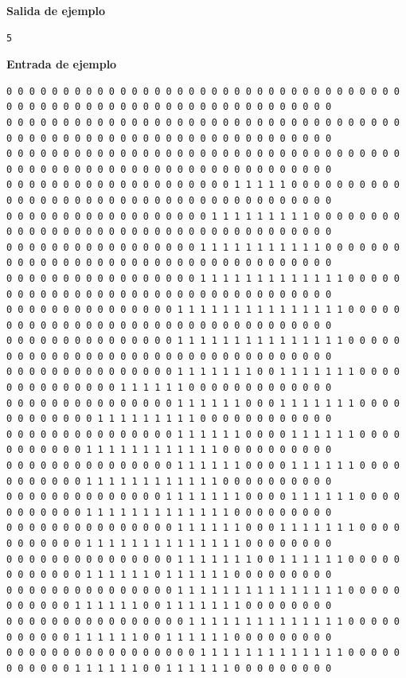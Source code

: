 \documentclass{oci}
\begin{document}
\begin{sampleDescription}
{\bf Salida de ejemplo}
\begin{verbatim}
5
\end{verbatim}
\newpage


{\bf Entrada de ejemplo}
{\tiny
\begin{verbatim}
0 0 0 0 0 0 0 0 0 0 0 0 0 0 0 0 0 0 0 0 0 0 0 0 0 0 0 0 0 0 0 0 0 0 0 0 0 0 0 0 0 0 0 0 0 0 0 0 0 0 0 0 0 0 0 0 0 0 0 0 0 0 0 0
0 0 0 0 0 0 0 0 0 0 0 0 0 0 0 0 0 0 0 0 0 0 0 0 0 0 0 0 0 0 0 0 0 0 0 0 0 0 0 0 0 0 0 0 0 0 0 0 0 0 0 0 0 0 0 0 0 0 0 0 0 0 0 0
0 0 0 0 0 0 0 0 0 0 0 0 0 0 0 0 0 0 0 0 0 0 0 0 0 0 0 0 0 0 0 0 0 0 0 0 0 0 0 0 0 0 0 0 0 0 0 0 0 0 0 0 0 0 0 0 0 0 0 0 0 0 0 0
0 0 0 0 0 0 0 0 0 0 0 0 0 0 0 0 0 0 0 0 1 1 1 1 1 0 0 0 0 0 0 0 0 0 0 0 0 0 0 0 0 0 0 0 0 0 0 0 0 0 0 0 0 0 0 0 0 0 0 0 0 0 0 0
0 0 0 0 0 0 0 0 0 0 0 0 0 0 0 0 0 0 1 1 1 1 1 1 1 1 1 0 0 0 0 0 0 0 0 0 0 0 0 0 0 0 0 0 0 0 0 0 0 0 0 0 0 0 0 0 0 0 0 0 0 0 0 0
0 0 0 0 0 0 0 0 0 0 0 0 0 0 0 0 0 1 1 1 1 1 1 1 1 1 1 1 0 0 0 0 0 0 0 0 0 0 0 0 0 0 0 0 0 0 0 0 0 0 0 0 0 0 0 0 0 0 0 0 0 0 0 0
0 0 0 0 0 0 0 0 0 0 0 0 0 0 0 0 0 1 1 1 1 1 1 1 1 1 1 1 1 1 0 0 0 0 0 0 0 0 0 0 0 0 0 0 0 0 0 0 0 0 0 0 0 0 0 0 0 0 0 0 0 0 0 0
0 0 0 0 0 0 0 0 0 0 0 0 0 0 0 1 1 1 1 1 1 1 1 1 1 1 1 1 1 1 0 0 0 0 0 0 0 0 0 0 0 0 0 0 0 0 0 0 0 0 0 0 0 0 0 0 0 0 0 0 0 0 0 0
0 0 0 0 0 0 0 0 0 0 0 0 0 0 0 1 1 1 1 1 1 1 1 1 1 1 1 1 1 1 0 0 0 0 0 0 0 0 0 0 0 0 0 0 0 0 0 0 0 0 0 0 0 0 0 0 0 0 0 0 0 0 0 0
0 0 0 0 0 0 0 0 0 0 0 0 0 0 0 1 1 1 1 1 1 1 0 0 1 1 1 1 1 1 1 0 0 0 0 0 0 0 0 0 0 0 0 0 0 1 1 1 1 1 1 0 0 0 0 0 0 0 0 0 0 0 0 0
0 0 0 0 0 0 0 0 0 0 0 0 0 0 0 1 1 1 1 1 1 0 0 0 1 1 1 1 1 1 1 0 0 0 0 0 0 0 0 0 0 0 0 1 1 1 1 1 1 1 1 1 0 0 0 0 0 0 0 0 0 0 0 0
0 0 0 0 0 0 0 0 0 0 0 0 0 0 0 1 1 1 1 1 1 0 0 0 0 1 1 1 1 1 1 0 0 0 0 0 0 0 0 0 0 0 1 1 1 1 1 1 1 1 1 1 1 1 0 0 0 0 0 0 0 0 0 0
0 0 0 0 0 0 0 0 0 0 0 0 0 0 0 1 1 1 1 1 1 0 0 0 0 1 1 1 1 1 1 0 0 0 0 0 0 0 0 0 0 0 1 1 1 1 1 1 1 1 1 1 1 1 0 0 0 0 0 0 0 0 0 0
0 0 0 0 0 0 0 0 0 0 0 0 0 0 1 1 1 1 1 1 1 0 0 0 0 1 1 1 1 1 1 0 0 0 0 0 0 0 0 0 0 0 1 1 1 1 1 1 1 1 1 1 1 1 1 0 0 0 0 0 0 0 0 0
0 0 0 0 0 0 0 0 0 0 0 0 0 0 0 1 1 1 1 1 1 0 0 0 1 1 1 1 1 1 1 0 0 0 0 0 0 0 0 0 0 0 1 1 1 1 1 1 1 1 1 1 1 1 1 1 0 0 0 0 0 0 0 0
0 0 0 0 0 0 0 0 0 0 0 0 0 0 0 1 1 1 1 1 1 1 0 0 1 1 1 1 1 1 0 0 0 0 0 0 0 0 0 0 0 0 1 1 1 1 1 1 0 1 1 1 1 1 1 0 0 0 0 0 0 0 0 0
0 0 0 0 0 0 0 0 0 0 0 0 0 0 0 1 1 1 1 1 1 1 1 1 1 1 1 1 1 1 0 0 0 0 0 0 0 0 0 0 0 1 1 1 1 1 1 0 0 1 1 1 1 1 1 1 0 0 0 0 0 0 0 0
0 0 0 0 0 0 0 0 0 0 0 0 0 0 0 0 1 1 1 1 1 1 1 1 1 1 1 1 1 1 0 0 0 0 0 0 0 0 0 0 0 1 1 1 1 1 1 0 0 1 1 1 1 1 1 0 0 0 0 0 0 0 0 0
0 0 0 0 0 0 0 0 0 0 0 0 0 0 0 0 0 1 1 1 1 1 1 1 1 1 1 1 1 1 0 0 0 0 0 0 0 0 0 0 0 1 1 1 1 1 1 0 0 1 1 1 1 1 1 0 0 0 0 0 0 0 0 0

\end{verbatim}}
\end{sampleDescription}
\end{document}
